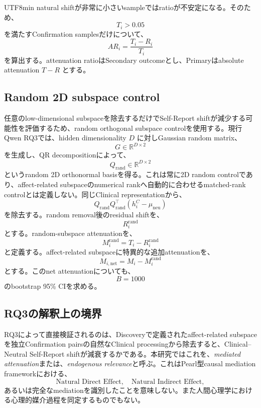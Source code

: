 \documentclass{article} %
\begin{document}
\begin{CJK*}{UTF8}{min}
natural shiftが非常に小さいsampleではratioが不安定になる。そのため、
\[
T_i>0.05
\]
を満たすConfirmation samplesだけについて、
\[
AR_i
=
\frac{
T_i-R_i
}{
T_i
}
\]
を算出する。attenuation ratioはSecondary outcomeとし、Primaryはabsolute attenuation \(T-R\) とする。


\subsection{Random 2D subspace control}

任意のlow-dimensional subspaceを除去するだけでSelf-Report shiftが減少する可能性を評価するため、random orthogonal subspace controlを使用する。現行Qwen RQ3では、hidden dimensionality \(D\) に対しGaussian random matrix、
\[
G
\in
\mathbb{R}^{D\times2}
\]
を生成し、QR decompositionによって、
\[
Q_{\mathrm{rand}}
\in
\mathbb{R}^{D\times2}
\]
というrandom 2D orthonormal basisを得る。これは常に2D random controlであり、affect-related subspaceのnumerical rankへ自動的に合わせるmatched-rank controlとは定義しない。同じClinical representationから、
\[
Q_{\mathrm{rand}}
Q_{\mathrm{rand}}^\top
(
h_i^C-\mu_{\mathrm{neu}}
)
\]
を除去する。random removal後のresidual shiftを、
\[
R_i^{\mathrm{rand}}
\]
とする。random-subspace attenuationを、
\[
M_i^{\mathrm{rand}}
=
T_i-R_i^{\mathrm{rand}}
\]
と定義する。affect-related subspaceに特異的な追加attenuationを、
\[
M_{i,\mathrm{net}}
=
M_i
-
M_i^{\mathrm{rand}}
\]
とする。このnet attenuationについても、
\[
B=1000
\]
のbootstrap 95\% CIを求める。


\subsection{RQ3の解釈上の境界}

RQ3によって直接検証されるのは、Discoveryで定義されたaffect-related subspaceを独立Confirmation pairsの自然なClinical processingから除去すると、Clinical--Neutral Self-Report shiftが減衰するかである。本研究ではこれを、\textit{mediated attenuation}または、\textit{endogenous relevance}と呼ぶ。これはPearl型causal mediation frameworkにおける、
\[
\text{Natural Direct Effect},
\quad
\text{Natural Indirect Effect},
\]
あるいは完全なmediationを識別したことを意味しない。また人間心理学における心理的媒介過程を同定するものでもない。




\end{CJK*}
\end{document}
